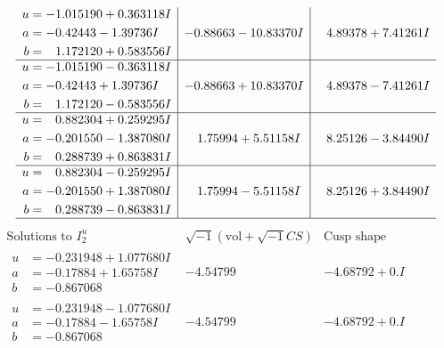 \documentclass[1p]{elsarticle_modified}
\theoremstyle{definition}
\newcommand{\I}{\sqrt{-1}}
\begin{document}
$$\begin{array}{c|c|c}
\begin{aligned}
u &= -1.015190 + 0.363118 I \\
a &= -0.42443 - 1.39736 I \\
b &= \phantom{-}1.172120 + 0.583556 I\end{aligned}
 & -0.88663 - 10.83370 I & \phantom{-}4.89378 + 7.41261 I \\ \hline\begin{aligned}
u &= -1.015190 - 0.363118 I \\
a &= -0.42443 + 1.39736 I \\
b &= \phantom{-}1.172120 - 0.583556 I\end{aligned}
 & -0.88663 + 10.83370 I & \phantom{-}4.89378 - 7.41261 I \\ \hline\begin{aligned}
u &= \phantom{-}0.882304 + 0.259295 I \\
a &= -0.201550 - 1.387080 I \\
b &= \phantom{-}0.288739 + 0.863831 I\end{aligned}
 & \phantom{-}1.75994 + 5.51158 I & \phantom{-}8.25126 - 3.84490 I \\ \hline\begin{aligned}
u &= \phantom{-}0.882304 - 0.259295 I \\
a &= -0.201550 + 1.387080 I \\
b &= \phantom{-}0.288739 - 0.863831 I\end{aligned}
 & \phantom{-}1.75994 - 5.51158 I & \phantom{-}8.25126 + 3.84490 I\\
 \hline 
 \end{array}$$\newpage$$\begin{array}{c|c|c}  
\text{Solutions to }I^u_{2}& \I (\text{vol} + \sqrt{-1}CS) & \text{Cusp shape}\\
 \hline 
\begin{aligned}
u &= -0.231948 + 1.077680 I \\
a &= -0.17884 + 1.65758 I \\
b &= -0.867068\phantom{ +0.000000I}\end{aligned}
 & -4.54799\phantom{ +0.000000I} & -4.68792 + 0. I\phantom{ +0.000000I} \\ \hline\begin{aligned}
u &= -0.231948 - 1.077680 I \\
a &= -0.17884 - 1.65758 I \\
b &= -0.867068\phantom{ +0.000000I}\end{aligned}
 & -4.54799\phantom{ +0.000000I} & -4.68792 + 0. I\phantom{ +0.000000I} \\ \hline\begin{aligned}

\end{aligned}
\end{array}$$
\end{document}
